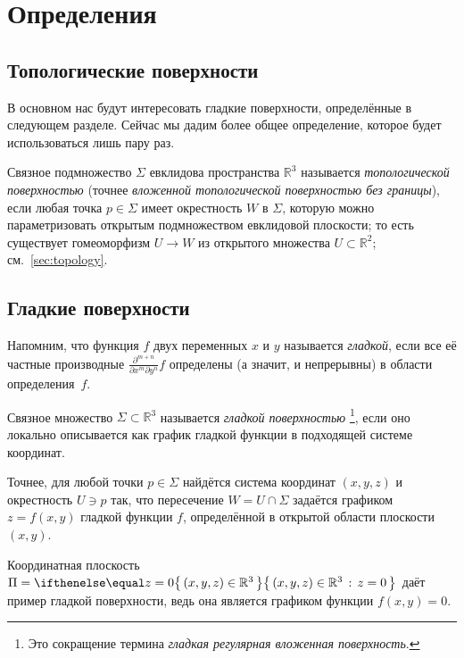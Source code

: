 \chapter{Определения}
\label{chap:surfaces-def}

\section{Топологические поверхности}

В основном нас будут интересовать гладкие поверхности, определённые в следующем разделе.
Сейчас мы дадим более общее определение, которое будет использоваться лишь пару раз.

Связное подмножество $\Sigma$ евклидова пространства $\mathbb{R}^3$
называется \emph{топологической поверхностью} (точнее {}\emph{вложенной топологической поверхностью без границы}),
если любая точка $p\in \Sigma$ имеет окрестность $W$ в $\Sigma$,
которую можно параметризовать открытым подмножеством евклидовой плоскости;
то есть существует гомеоморфизм $U\to W$ из открытого множества $U\subset \mathbb{R}^2$; см.~\ref{sec:topology}.

\section{Гладкие поверхности}\label{sec:def-smooth-surface}

Напомним, что функция $f$ двух переменных $x$ и $y$ называется \emph{гладкой}, если все её частные производные $\frac{\partial^{m+n}}{\partial x^m\partial y^n}f$ определены (а значит, и непрерывны) в области определения~$f$.

{\sloppy

Связное множество $\Sigma \subset \mathbb{R}^3$ называется \emph{гладкой поверхностью}%
\footnote{Это сокращение термина {}\emph{гладкая регулярная вложенная поверхность}.}, если оно локально описывается как график гладкой функции в подходящей системе координат.

Точнее, для любой точки $p\in \Sigma$ найдётся система координат $(x,y,z)$ и окрестность $U\ni p$ так, что
пересечение $W=U\cap \Sigma$ задаётся графиком $z=f(x,y)$ гладкой функции $f$, определённой в открытой области плоскости $(x,y)$.

}

Координатная плоскость
$\Pi=\set{(x,y,z)\in\mathbb{R}^3}{z=0}$
даёт пример гладкой поверхности, ведь она является графиком функции $f(x,y)=0$.

